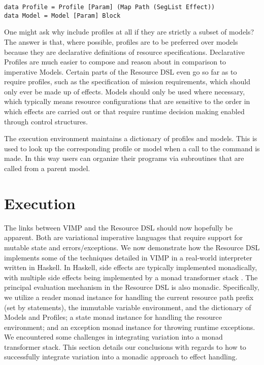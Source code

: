 \documentclass[12pt,oneside]{book}
\begin{document}
\begin{lstlisting}
data Profile = Profile [Param] (Map Path (SegList Effect))
data Model = Model [Param] Block
\end{lstlisting}

One might ask why include profiles at all if they are strictly a subset of models? The answer is that, where possible, profiles
are to be preferred over models because they are declarative definitions of resource specifications. Declarative Profiles
are much easier to compose and reason about in comparison to imperative Models. Certain parts of the Resource DSL
even go so far as to require profiles, such as the specification of mission requirements, which should only ever be made up
of  effects. Models should only be used where necessary, which typically means resource configurations that are
sensitive to the order in which effects are carried out or that require runtime decision making enabled through control structures.

The execution environment maintains a dictionary of profiles and models. This is used to look up the corresponding profile or
model when a call to the  command is made. In this way users can organize their programs via subroutines that are
called from a parent model.


\section{Execution} 

The links between VIMP and the Resource DSL should now hopefully be apparent. Both are variational imperative
languages that require support for mutable state and errors/exceptions. We now demonstrate how the Resource
DSL implements some of the techniques detailed in VIMP in a real-world interpreter written in Haskell. In Haskell,
side effects are typically implemented monadically, with multiple side effects being implemented by a monad transformer
stack \cite{liang1995monad}. The principal evaluation mechanism in the Resource DSL is also monadic. Specifically,
we utilize a reader monad instance for handling the current resource path prefix (set by  statements),
the immutable variable environment, and the dictionary of Models and Profiles; a state monad instance for handling
the resource environment; and an exception monad instance for throwing runtime exceptions.
We encountered
some challenges in integrating variation into a monad transformer stack. This section details our conclusions with regards to
how to successfully integrate variation into a monadic approach to effect handling.
\end{document}
